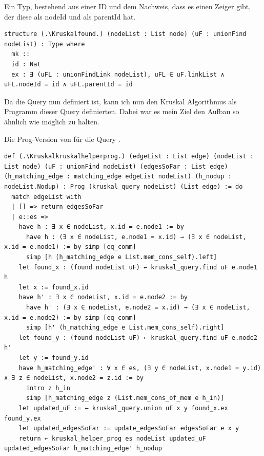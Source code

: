 \begin{definition}[\Kruskalfound]
  Ein Typ, bestehend aus einer ID und dem Nachweis, dass es einen Zeiger gibt, der diese als nodeId und als parentId hat.
\end{definition}
\begin{lstlisting}
structure (.\Kruskalfound.) (nodeList : List node) (uF : unionFind nodeList) : Type where
  mk ::
  id : Nat
  ex : ∃ (uFL : unionFindLink nodeList), uFL ∈ uF.linkList ∧ uFL.nodeId = id ∧ uFL.parentId = id
\end{lstlisting}

Da die Query nun definiert ist, kann ich nun den Kruskal Algorithmus als Programm dieser Query definierten.
Dabei war es mein Ziel den Aufbau so ähnlich wie möglich zu halten.

\begin{definition}[\Kruskalkruskalhelperprog]
  Die Prog-Version von \Kruskalkruskalhelper für die Query \Kruskalkruskalquery.
\end{definition}
\begin{lstlisting}
def (.\Kruskalkruskalhelperprog.) (edgeList : List edge) (nodeList : List node) (uF : unionFind nodeList) (edgesSoFar : List edge) (h_matching_edge : matching_edge edgeList nodeList) (h_nodup : nodeList.Nodup) : Prog (kruskal_query nodeList) (List edge) := do
  match edgeList with
  | [] => return edgesSoFar
  | e::es =>
    have h : ∃ x ∈ nodeList, x.id = e.node1 := by
      have h : (∃ x ∈ nodeList, e.node1 = x.id) → (∃ x ∈ nodeList, x.id = e.node1) := by simp [eq_comm]
      simp [h (h_matching_edge e List.mem_cons_self).left]
    let found_x : (found nodeList uF) ← kruskal_query.find uF e.node1 h
    let x := found_x.id
    have h' : ∃ x ∈ nodeList, x.id = e.node2 := by
      have h' : (∃ x ∈ nodeList, e.node2 = x.id) → (∃ x ∈ nodeList, x.id = e.node2) := by simp [eq_comm]
      simp [h' (h_matching_edge e List.mem_cons_self).right]
    let found_y : (found nodeList uF) ← kruskal_query.find uF e.node2 h'
    let y := found_y.id
    have h_matching_edge' : ∀ x ∈ es, (∃ y ∈ nodeList, x.node1 = y.id) ∧ ∃ z ∈ nodeList, x.node2 = z.id := by
      intro z h_in
      simp [h_matching_edge z (List.mem_cons_of_mem e h_in)]
    let updated_uF := ← kruskal_query.union uF x y found_x.ex found_y.ex
    let updated_edgesSoFar := update_edgesSoFar edgesSoFar e x y
    return ← kruskal_helper_prog es nodeList updated_uF updated_edgesSoFar h_matching_edge' h_nodup
\end{lstlisting}


